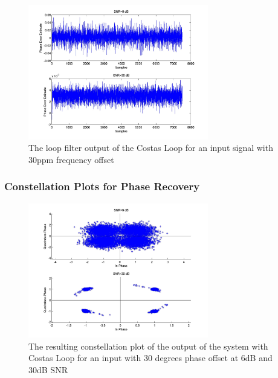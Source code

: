 \documentclass[]{article}
\begin{document}
\begin{figure}[H]
\centering
\hspace*{-2cm}\includegraphics[width=0.7\textwidth]{qpLoopFilterfo_costas2.jpg}
\caption{The loop filter output of the Costas Loop for an input signal with 30ppm frequency offset}
\end{figure}
\subsubsection{Constellation Plots  for Phase Recovery}
\begin{figure}[H]
\centering
\hspace*{-2cm}\includegraphics[width=0.7\textwidth]{qpConstpo_costas1.jpg}
\caption{The resulting constellation plot of the output of the system with Costas Loop for an input with 30 degrees phase offset at 6dB and 30dB SNR }
\end{figure}
\end{document}

